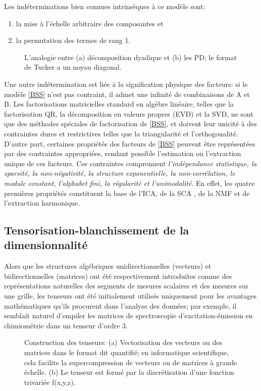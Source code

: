 \documentclass[11pt,a4paper,oneside]{book}
\newcommand{\encad}[1]{%
 \fbox{\begin{minipage}[t]{\linewidth}%
  #1\end{minipage}}}
\begin{document}
Les indéterminations bien connues intrinsèques à ce modèle sont:
\begin{enumerate}
 \item
 la mise à l'échelle arbitraire des composantes et
 \item 
 la permutation des termes de rang 1.
\end{enumerate} 
\begin{figure}[!h]
	\centering
	\encad{\centering
		\texttt{[image: "My figures/FIG44"]}}
	\caption{L'analogie entre (a) décomposition dyadique et (b) les PD; le format de Tucker a un noyau diagonal.} %
	\label{fig:fig44}
\end{figure}
Une autre indétermination est liée à la signification physique des facteurs: si le modèle \eqref{BSS} n'est pas contraint, il admet une infinité de combinaisons de A et B. Les factorisations matricielles standard en algèbre linéaire, telles que la factorisation QR, la décomposition en valeurs propres (EVD) et la SVD, ne sont que des méthodes spéciales de factorisation de \eqref{BSS}, et doivent leur unicité à des contraintes dures et restrictives telles que la triangularité et l'orthogonalité. D'autre part, certaines propriétés des facteurs de \eqref{BSS} peuvent être représentées par des contraintes appropriées, rendant possible l'estimation ou l'extraction unique de ces facteurs. Ces contraintes comprennent \textit{l'indépendance statistique, la sparsité, la non-négativité, la structure exponentielle, la non-corrélation, le module constant, l'alphabet fini, la régularité et l'unimodalité}. En effet, les quatre premières propriétés constituent la base de l'ICA, de la SCA , de la NMF  et de l'extraction harmonique.

\subsection{Tensorisation-blanchissement de la dimensionnalité}
Alors que les structures algébriques unidirectionnelles (vecteurs) et bidirectionnelles (matrices) ont été respectivement introduites comme des représentations naturelles des segments de mesures scalaires et des mesures sur une grille, les tenseurs ont été initialement utilisés uniquement pour les avantages mathématiques qu'ils procurent dans l'analyse des données; par exemple, il semblait naturel d'empiler les matrices de spectroscopie d'excitation-émission en chimiométrie dans un tenseur d'ordre 3.

\begin{figure}[!h]
	\encad{\centering \texttt{[image: "My figures/AFIG3A"]}}
	\caption{Construction des tenseurs: (a) Vectorisation des vecteurs ou des matrices  dans le format dit quantifié; en informatique scientifique, cela facilite la supercompression de vecteurs ou de matrices à grande échelle. (b) Le tenseur est formé par la discrétisation d'une fonction trivariée f(x,y,z).}
	\label{fig:afig3a}
\end{figure}
\end{document}
